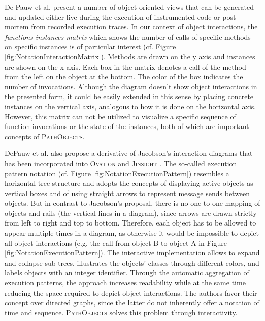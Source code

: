 De Pauw et al. present a number of object-oriented views \cite{de_pauw_visualizing_1993, tokoro_modeling_1994} that can be generated and updated either live during the execution of instrumented code or post-mortem from recorded execution traces.
In our context of object interactions, the \emph{functions-instances matrix} which shows the number of calls of specific methods on specific instances is of particular interest (cf. Figure \ref{fig:NotationInteractionMatrix}).
Methods are drawn on the y axis and instances are shown on the x axis.
Each box in the matrix denotes a call of the method from the left on the object at the bottom.
The color of the box indicates the number of invocations.
Although the diagram doesn't show object interactions in the presented form, it could be easily extended in this sense by placing concrete instances on the vertical axis, analogous to how it is done on the horizontal axis.
However, this matrix can not be utilized to visualize a specific sequence of function invocations or the state of the instances, both of which are important concepts of \textsc{PathObjects}.

DePauw et al. also propose a derivative of Jacobson's interaction diagrams \cite{de_pauw_execution_1998, jacobson_object-oriented_2004} that has been incorporated into \textsc{Ovation} \cite{de_pauw_visualizing_1993, tokoro_modeling_1994} and \textsc{Jinsight} \cite{de_pauw_visualizing_1998}.
The so-called execution pattern notation (cf. Figure \ref{fig:NotationExecutionPattern}) resembles a horizontal tree structure and adopts the concepts of displaying active objects as vertical boxes and of using straight arrows to represent message sends between objects.
But in contrast to Jacobson's proposal, there is no one-to-one mapping of objects and rails (the vertical lines in a diagram), since arrows are drawn strictly from left to right and top to bottom.
Therefore, each object has to be allowed to appear multiple times in a diagram, as otherwise it would be impossible to depict all object interactions (e.g. the call from object B to object A in Figure \ref{fig:NotationExecutionPattern}).
The interactive implementation allows to expand and collapse sub-trees, illustrates the objects' classes through different colors, and labels objects with an integer identifier.
Through the automatic aggregation of execution patterns, the approach increases readability while at the same time reducing the  space required to depict object interactions.
The authors favor their concept over directed graphs, since the latter do not inherently offer a notation of time and sequence.
\textsc{PathObjects} solves this problem through interactivity.

